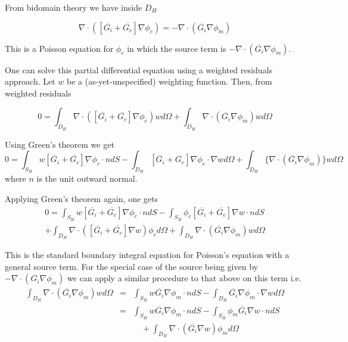 From bidomain theory we have inside $D_{H}$

\begin{equation}
\nabla \cdot ([\overline{G_{i}}+\overline{G_{e}}]\nabla \phi _{e})=-\nabla
\cdot (\overline{G_{i}}\nabla \phi _{m})  \label{current_cons}
\end{equation}

This is a Poisson equation for $\phi _{e}$ in which the source term is $%
-\nabla \cdot (\overline{G_{i}}\nabla \phi _{m}).$

One can solve this partial differential equation using a weighted residuals approach. 
Let $w$ be a (as-yet-unspecified) weighting function. Then, from weighted residuals

\begin{equation}
0=\int_{D_{H}}\nabla \cdot ([\overline{G_{i}}+\overline{G_{e}}]\nabla \phi
_{e})wd\Omega +\int_{D_{H}}\nabla \cdot (\overline{G_{i}}\nabla \phi
_{m})wd\Omega  \label{weighted_resid}
\end{equation}

Using Green's theorem we get
\begin{equation}
0=\int_{S_{H}}w[\overline{G_{i}}+\overline{G_{e}}]\nabla \phi _{e}\cdot
ndS-\int_{D_{H}}[\overline{G_{i}}+\overline{G_{e}}]\nabla \phi _{e}\cdot
\nabla wd\Omega +\int_{D_{H}}\{\nabla \cdot (\overline{G_{i}}\nabla \phi
_{m})\}wd\Omega  \label{Start_fem_eqtn}
\end{equation}
where $n$ is the unit outward normal.

Applying Green's theorem again, one gets 
\begin{multline}
        0 =\int_{S_{H}}w[\overline{G_{i}}+\overline{G_{e}}]\nabla \phi _{e}\cdot
        ndS-\int_{S_{H}}\phi _{e}[\overline{G_{i}}+\overline{G_{e}}]\nabla w\cdot
        ndS  \\
        + \int_{D_{H}}\nabla \cdot ([\overline{G_{i}}+\overline{G_{e}}]\nabla w)
        \phi_{e}d\Omega +\int_{D_{H}}\nabla \cdot (\overline{G_{i}}\nabla 
        \phi_{m})wd\Omega   
        \label{Start_bem_eqtn}
\end{multline}

This is the standard boundary integral equation for Poisson's equation with
a general source term. For the special case of the source being given by $-%
\nabla \cdot (\overline{G_{i}}\nabla \phi _{m})$ we can apply a similar
procedure to that above on this term i.e. 
\begin{eqnarray}
\int_{D_{H}}\nabla \cdot (\overline{G_{i}}\nabla \phi _{m})wd\Omega 
        &=&\int_{S_{H}}w\overline{G_{i}}\nabla \phi _{m}\cdot ndS-\int_{D_{H}}
        \overline{G_{i}}\nabla \phi _{m}\cdot \nabla wd\Omega   \nonumber \\
        &=&\int_{S_{H}}w\overline{G_{i}}\nabla \phi _{m}\cdot ndS 
                -\int_{S_{H}} \phi_{m}\overline{G_{i}}\nabla w\cdot ndS  \nonumber \\
                && \quad + \int_{D_{H}}\nabla \cdot (\overline{G_{i}}\nabla w)\phi _{m}d\Omega 
        \label{source_term}
\end{eqnarray}

